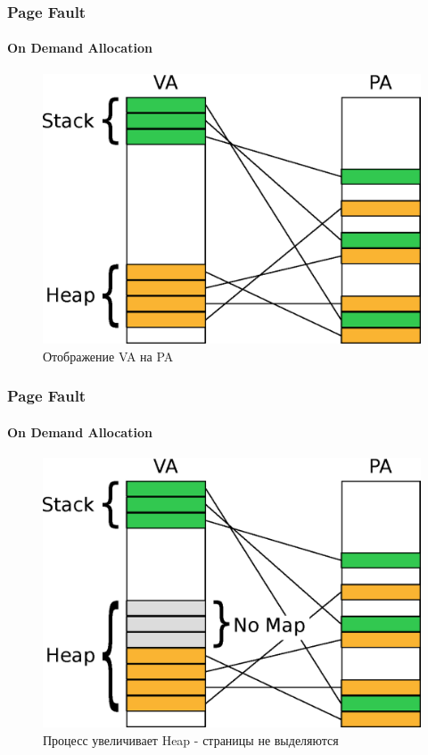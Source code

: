 \begin{frame}
\frametitle{Page Fault}
\framesubtitle{On Demand Allocation}

\begin{figure}
  \centering\includegraphics[width=.8\linewidth]{page-demand0}
  \caption{Отображение VA на PA}
\end{figure}
\end{frame}

\begin{frame}
\frametitle{Page Fault}
\framesubtitle{On Demand Allocation}

\begin{figure}
  \centering\includegraphics[width=.8\linewidth]{page-demand1}
  \caption{Процесс увеличивает Heap - страницы не выделяются}
\end{figure}
\end{frame}


